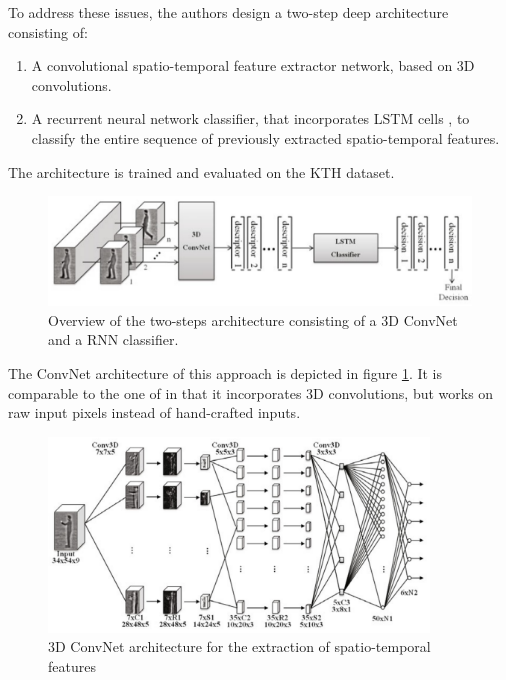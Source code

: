 To address these issues, the authors design a two-step deep architecture consisting of:

\begin{enumerate}
    \item A convolutional spatio-temporal feature extractor network, based on 3D convolutions.
    \item A recurrent neural network classifier, that incorporates LSTM cells \cite{hochreiter_long_1997}, to classify the entire sequence of previously extracted spatio-temporal features.
\end{enumerate}

The architecture is trained and evaluated on the KTH dataset.

\begin{figure}[H]
    \centering
    \includegraphics[width=\textwidth]{img_deep/sequentialdeep_overview.png}
    \caption{Overview of the two-steps architecture consisting of a 3D ConvNet and a RNN classifier. \cite{baccouche_sequential_2011}}
    \label{fig:sequentialdeep_overview}
\end{figure}

The ConvNet architecture of this approach is depicted in figure \ref{fig:sequentialdeep_overview}.
It is comparable to the one of \textcite{ji_3d_2013} in that it incorporates 3D convolutions, but works on raw input pixels instead of hand-crafted inputs.

\begin{figure}[H]
    \centering
    \includegraphics[width=0.9\textwidth]{img_deep/sequentialdeep_cnnarchitecture}
    \caption{3D ConvNet architecture for the extraction of spatio-temporal features \cite{baccouche_sequential_2011}}
    \label{fig:sequentialdeep_cnnarchitecture}
\end{figure}

